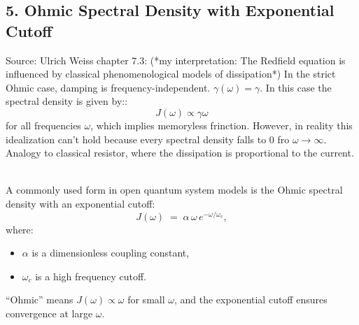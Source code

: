 \subsection*{5. Ohmic Spectral Density with Exponential Cutoff}
Source: Ulrich Weiss chapter 7.3:
(*my interpretation: The Redfield equation is influenced by classical phenomenological models of dissipation*)
In the strict Ohmic case, damping is frequency-independent. $ \gamma(\omega) = \gamma $. 
In this case the spectral density is given by::
\begin{equation}
  J(\omega) \propto \gamma \omega
\end{equation}
for all frequencies $\omega$, which implies memoryless frinction. 
However, in reality this idealization can't hold because every spectral density falls to 0 fro $\omega \to \infty$.
Analogy to classical resistor, where the dissipation is proportional to the current.

\\
A commonly used form in open quantum system models is the Ohmic spectral density with an exponential cutoff:
\[
J(\omega) \;=\; \alpha \,\omega\, e^{-\omega/\omega_c},
\]
where:
\begin{itemize}
  \item $\alpha$ is a dimensionless coupling constant,
  \item $\omega_c$ is a high frequency cutoff.
\end{itemize}
``Ohmic'' means $J(\omega) \propto \omega$ for small $\omega$, and the exponential cutoff ensures convergence at large $\omega$.